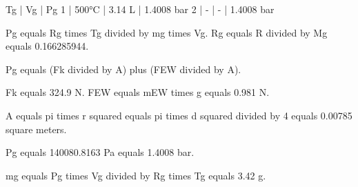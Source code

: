 Tg | Vg | Pg  
1 | 500°C | 3.14 L | 1.4008 bar  
2 | - | - | 1.4008 bar  

Pg equals Rg times Tg divided by mg times Vg.  
Rg equals R divided by Mg equals 0.166285944.  

Pg equals (Fk divided by A) plus (FEW divided by A).  

Fk equals 324.9 N.  
FEW equals mEW times g equals 0.981 N.  

A equals pi times r squared equals pi times d squared divided by 4 equals 0.00785 square meters.  

Pg equals 140080.8163 Pa equals 1.4008 bar.  

mg equals Pg times Vg divided by Rg times Tg equals 3.42 g.
